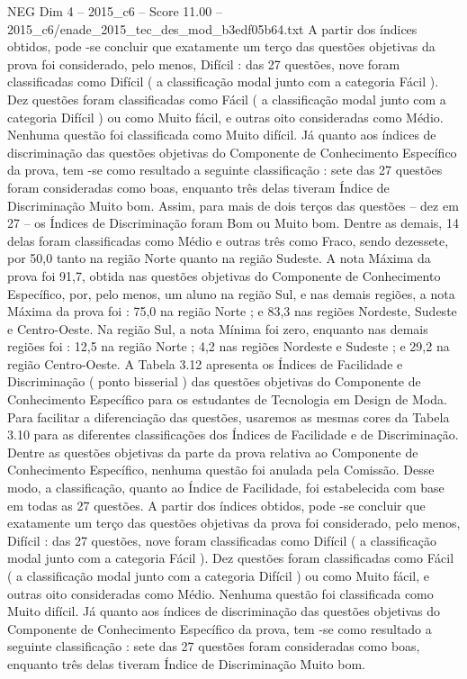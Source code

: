 \begin{textsample}{NEG Dim 4 – 2015\_c6 – Score 11.00 – 2015\_c6/enade\_2015\_tec\_des\_mod\_b3edf05b64.txt}
A partir dos índices obtidos, pode -se concluir que exatamente um terço das questões objetivas da prova foi considerado, pelo menos, Difícil : das 27 questões, nove foram classificadas como Difícil ( a classificação modal junto com a categoria Fácil ).
Dez questões foram classificadas como Fácil ( a classificação modal junto com a categoria Difícil ) ou como Muito fácil, e outras oito consideradas como Médio.
Nenhuma questão foi classificada como Muito difícil.
Já quanto aos índices de discriminação das questões objetivas do Componente de Conhecimento Específico da prova, tem -se como resultado a seguinte classificação : sete das 27 questões foram consideradas como boas, enquanto três delas tiveram Índice de Discriminação Muito bom.
Assim, para mais de dois terços das questões – dez em 27 – os Índices de Discriminação foram Bom ou Muito bom.
Dentre as demais, 14 delas foram classificadas como Médio e outras três como Fraco, sendo dezessete, por 50,0 tanto na região Norte quanto na região Sudeste.
A nota Máxima da prova foi 91,7, obtida nas questões objetivas do Componente de Conhecimento Específico, por, pelo menos, um aluno na região Sul, e nas demais regiões, a nota Máxima da prova foi : 75,0 na região Norte ; e 83,3 nas regiões Nordeste, Sudeste e Centro-Oeste.
Na região Sul, a nota Mínima foi zero, enquanto nas demais regiões foi : 12,5 na região Norte ; 4,2 nas regiões Nordeste e Sudeste ; e 29,2 na região Centro-Oeste.
A Tabela 3.12 apresenta os Índices de Facilidade e Discriminação ( ponto bisserial ) das questões objetivas do Componente de Conhecimento Específico para os estudantes de Tecnologia em Design de Moda.
Para facilitar a diferenciação das questões, usaremos as mesmas cores da Tabela 3.10 para as diferentes classificações dos Índices de Facilidade e de Discriminação.
Dentre as questões objetivas da parte da prova relativa ao Componente de Conhecimento Específico, nenhuma questão foi anulada pela Comissão.
Desse modo, a classificação, quanto ao Índice de Facilidade, foi estabelecida com base em todas as 27 questões.
A partir dos índices obtidos, pode -se concluir que exatamente um terço das questões objetivas da prova foi considerado, pelo menos, Difícil : das 27 questões, nove foram classificadas como Difícil ( a classificação modal junto com a categoria Fácil ).
Dez questões foram classificadas como Fácil ( a classificação modal junto com a categoria Difícil ) ou como Muito fácil, e outras oito consideradas como Médio.
Nenhuma questão foi classificada como Muito difícil.
Já quanto aos índices de discriminação das questões objetivas do Componente de Conhecimento Específico da prova, tem -se como resultado a seguinte classificação : sete das 27 questões foram consideradas como boas, enquanto três delas tiveram Índice de Discriminação Muito bom.

\end{textsample}
